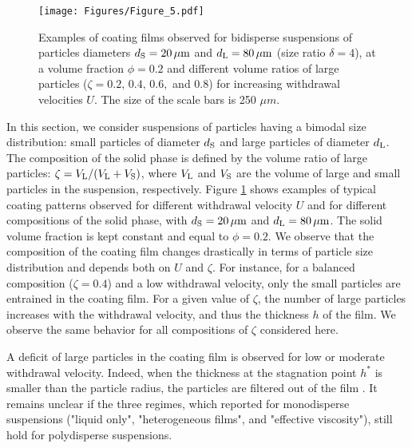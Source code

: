 \documentclass{jfm}
\begin{document}
\begin{figure}
\centering
\texttt{[image: Figures/Figure\_5.pdf]}
  \caption{Examples of coating films observed for bidisperse suspensions 
      of particles diameters $d_{\rm S}=20\,\mu{\rm m}$ and $d_{\rm L}=80\,\mu{\rm m}$ 
      (size ratio $\delta=4$), at a volume fraction $\phi=0.2$ 
      and different volume ratios of large particles ($\zeta=0.2,\,0.4,\,0.6,$ and $0.8$) 
      for increasing withdrawal velocities $U$.
      The size of the scale bars is 250 $\mu m$.
  }
  \label{fgr:Figure_5}
\end{figure}

In this section, we consider suspensions of particles having a bimodal size distribution: small particles of diameter $d_{\rm S}$ and large particles of diameter $d_{\rm L}$. The composition of the solid phase is defined by the volume ratio of large particles: $\zeta=V_{\rm L}/(V_{\rm L}+V_{\rm S})$, where $V_{\rm L}$ and $V_{\rm S}$ are the volume of large and small particles in the suspension, respectively. Figure \ref{fgr:Figure_5} shows examples of typical coating patterns observed for different withdrawal velocity $U$ and for different compositions of the solid phase, with $d_{\rm S}=20\,\mu{\rm m}$ and $d_{\rm L}=80\,\mu{\rm m}$. The solid volume fraction is kept constant and equal to $\phi=0.2$. We observe that the composition of the coating film changes drastically in terms of particle size distribution and depends both on $U$ and $\zeta$. For instance, for a balanced composition ($\zeta=0.4$) and a low withdrawal velocity, only the small particles are entrained in the coating film. For a given value of $\zeta$, the number of large particles increases with the withdrawal velocity, and thus the thickness $h$ of the film. We observe the same behavior for all compositions of $\zeta$ considered here.

A deficit of large particles in the coating film is observed for low or moderate withdrawal velocity. Indeed, when the thickness at the stagnation point $h^*$ is smaller than the particle radius, the particles are filtered out of the film \cite[][]{sauret2019capillary}. It remains unclear if the three regimes, which reported for monodisperse suspensions ("liquid only", "heterogeneous films", and "effective viscosity"), still hold for polydisperse suspensions.
\end{document}
